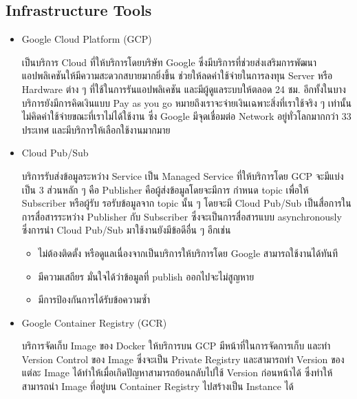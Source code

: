 \documentclass[12pt,oneside,openright,a4paper]{cpe-thai-project}
\begin{document}
  \subsection{Infrastructure Tools}
    \begin{itemize}
      \item Google Cloud Platform (GCP)
      
      \hspace{1cm}เป็นบริการ Cloud ที่ให้บริการโดยบริษัท Google ซึ่งมีบริการที่ช่วยส่งเสริมการพัฒนาแอปพลิเคชันให้มีความสะดวกสบายมากยิ่งขึ้น 
      ช่วยให้ลดค่าใช้จ่ายในการลงทุน Server หรือ Hardware ต่าง ๆ ที่ใช้ในการรันแอปพลิเคชัน และมีผู้ดูแลระบบให้ตลอด 24 ชม. อีกทั้งในบางบริการยังมีการคิดเงินแบบ Pay as you go 
      หมายถึงเราจะจ่ายเงินเฉพาะสิ่งที่เราใช้จริง ๆ เท่านั้น ไม่คิดค่าใช้จ่ายขณะที่เราไม่ได้ใช้งาน ซึ่ง Google มีจุดเชื่อมต่อ Network อยู่ทั่วโลกมากกว่า 33 ประเทศ และมีบริการให้เลือกใช้งานมากมาย \cite{gcp}

      \item Cloud Pub/Sub
      
      \hspace{1cm}บริการรับส่งข้อมูลระหว่าง Service เป็น Managed Service ที่ให้บริการโดย GCP จะมีแบ่งเป็น 3 ส่วนหลัก ๆ 
      คือ Publisher คือผู้ส่งข้อมูลโดยจะมีการ กำหนด topic เพื่อให้ Subscriber หรือผู้รับ รอรับข้อมูลจาก topic นั้น ๆ 
      โดยจะมี Cloud Pub/Sub เป็นสื่อการในการสื่อสารระหว่าง Publisher กับ Subscriber ซึ่งจะเป็นการสื่อสารแบบ asynchronously \cite{pubsub} 
      ซึ่งการนำ Cloud Pub/Sub มาใช้งานยังมีข้อดีอื่น ๆ อีกเช่น
      \begin{itemize}
        \item ไม่ต้องติดตั้ง หรือดูแลเนื่องจากเป็นบริการให้บริการโดย Google สามารถใช้งานได้ทันที
        \item มีความเสถียร มั่นใจได้ว่าข้อมูลที่ publish ออกไปจะไม่สูญหาย
        \item มีการป้องกันการได้รับข้อความซ้ำ
      \end{itemize}

      \item Google Container Registry (GCR)
      
      \hspace{1cm}บริการจัดเก็บ Image ของ Docker ให้บริการบน GCP มีหน้าที่ในการจัดการเก็บ และทำ Version Control ของ Image 
      ซึ่งจะเป็น Private Registry และสามารถทำ Version ของแต่ละ Image ได้ทำให้เมื่อเกิดปัญหาสามารถย้อนกลับไปใช้ Version ก่อนหน้าได้ 
      ซึ่งทำให้สามารถนำ Image ที่อยู่บน Container Registry ไปสร้างเป็น Instance ได้ \cite{GCR}
      

\end{itemize}
\end{document}
